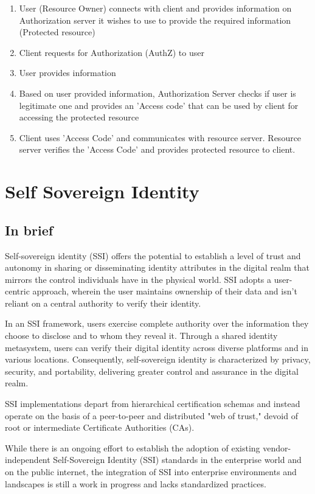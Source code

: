 \begin{enumerate}
\item User (Resource Owner) connects with client and provides information on Authorization server it wishes to use to provide the required information (Protected resource)

\item Client requests for Authorization (AuthZ) to user
\item User provides information
\item Based on user provided information, Authorization Server checks if user is legitimate one and provides an 'Access code' that can be used by client for accessing the protected resource
\item Client uses 'Access Code' and communicates with resource server. Resource server verifies the 'Access Code' and provides protected resource to client.

\end{enumerate}
\section*{Self Sovereign Identity}
\subsection*{In brief}
Self-sovereign identity (SSI) offers the potential to establish a level of trust and autonomy in sharing or disseminating identity attributes in the digital realm that mirrors the control individuals have in the physical world. SSI adopts a user-centric approach, wherein the user maintains ownership of their data and isn't reliant on a central authority to verify their identity.
\par
In an SSI framework, users exercise complete authority over the information they choose to disclose and to whom they reveal it. Through a shared identity metasystem, users can verify their digital identity across diverse platforms and in various locations. Consequently, self-sovereign identity is characterized by privacy, security, and portability, delivering greater control and assurance in the digital realm.
\par
SSI implementations depart from hierarchical certification schemas and instead operate on the basis of a peer-to-peer and distributed "web of trust," devoid of root or intermediate Certificate Authorities (CAs).
\par
While there is an ongoing effort to establish the adoption of existing vendor-independent Self-Sovereign Identity (SSI) standards in the enterprise world and on the public internet, the integration of SSI into enterprise environments and landscapes is still a work in progress and lacks standardized practices.

